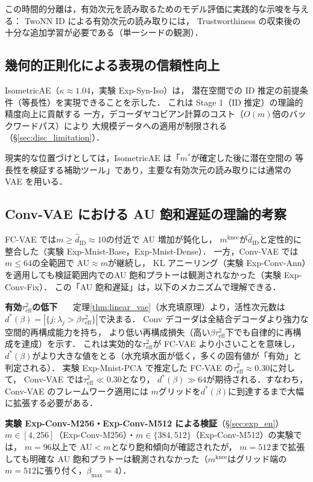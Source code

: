\documentclass[11pt,a4paper]{jsarticle}
\newcommand{\dzopt}{m^*}
\newcommand{\kap}{\kappa}
\newcommand{\mknee}{m^{\mathrm{knee}}}
\begin{document}
この時間的分離は，有効次元を読み取るためのモデル評価に実践的な示唆を与える：
TwoNN ID による有効次元の読み取りには，
Trustworthiness の収束後の十分な追加学習が必要である（単一シードの観測）．

\subsection{幾何的正則化による表現の信頼性向上}\label{sec:disc_isometric}

IsometricAE（$\kap \approx 1.04$，実験 Exp-Syn-Iso）は，
潜在空間での ID 推定の前提条件（等長性）を実現できることを示した．
これは Stage 1（ID 推定）の理論的精度向上に貢献する
一方，デコーダヤコビアン計算のコスト（$O(m)$倍のバックワードパス）により
大規模データへの適用が制限される（§\ref{sec:disc_limitation}）．

現実的な位置づけとしては，IsometricAE は「$\dzopt$が確定した後に潜在空間の
等長性を検証する補助ツール」であり，主要な有効次元の読み取りには通常の VAE を用いる．

\subsection{Conv-VAE における AU 飽和遅延の理論的考察}\label{sec:disc_convvae}

FC-VAE では$m \geq \hat{d}_\mathrm{ID} \approx 10$の付近で AU 増加が鈍化し，
$\mknee$が$\hat{d}_\mathrm{ID}$と定性的に整合した（実験 Exp-Mnist-Base，Exp-Mnist-Dense）．
一方，Conv-VAE では$m \leq 64$の全範囲で AU$\approx m$が継続し，
KL アニーリング（実験 Exp-Conv-Ann）を適用しても検証範囲内でのAU 飽和プラトーは観測されなかった（実験 Exp-Conv-Fix）．
この「AU 飽和遅延」は，以下のメカニズムで理解できる．

\textbf{有効$\tau^2_\mathrm{eff}$の低下}~~~
定理\ref{thm:linear_vae}（水充填原理）より，活性次元数は
$d^*(\beta) = |\{j : \lambda_j > \beta\tau^2_\mathrm{eff}\}|$で決まる．
Conv デコーダは全結合デコーダより強力な空間的再構成能力を持ち，
より低い再構成損失（高い$\beta\tau^2_\mathrm{eff}$下でも自律的に再構成を達成）を示す．
これは実効的な$\tau^2_\mathrm{eff}$が FC-VAE より小さいことを意味し，
$d^*(\beta)$がより大きな値をとる（水充填水面が低く，多くの固有値が「有効」と判定される）．
実験 Exp-Mnist-PCA で推定した FC-VAE の$\tau^2_\mathrm{eff} \approx 0.30$に対して，
Conv-VAE では$\tau^2_\mathrm{eff} \ll 0.30$となり，
$d^*(\beta) \gg 64$が期待される．すなわち，Conv-VAE のフレームワーク適用には
$m$グリッドを$d^*(\beta)$に到達するまで大幅に拡張する必要がある．

\textbf{実験 Exp-Conv-M256・Exp-Conv-M512 による検証}（§\ref{sec:exp_en}）~~~
$m \in [4,256]$（Exp-Conv-M256）・$m \in \{384,512\}$（Exp-Conv-M512）の実験では，
$m = 96$以上で AU$<m$となり飽和傾向が確認されたが，
$m=512$まで拡張しても明確な AU 飽和プラトーは観測されなかった（$\mknee$はグリッド端の$m=512$に張り付く，$\beta_{\max}=4$）．
\end{document}
